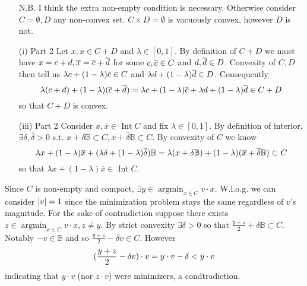\documentclass{article}
\newenvironment{ex}[1]
  {\renewcommand\theexercise{#1}\exercise}
  {\endexercise}
\newcommand{\B}{\mathbb{B}}
\DeclareMathOperator*{\argmin}{arg min}
\DeclareMathOperator*{\inte}{Int}
\newcommand{\idot}[2]{#1 \cdot #2}
\begin{document}
\begin{ex}{4.1}
\begin{itemize}
      N.B. I think the extra non-empty condition is necessary. Otherwise consider $C = \emptyset, D$ any non-convex set. $C \times D = \emptyset$ is vacuously convex, however $D$ is not.
    \item[(i) Part 2]
      \newcommand{\xb}{\overline{x}}
      Let $x, \xb \in C + D$ and $\lambda \in [0, 1]$. By definition of $C + D$ we must have $x = c + d, \xb = \cb + \db$ for some $c, \overline{c} \in C$ and $d, \overline{d} \in D$. Convexity of $C, D$ then tell us $\lambda c + (1-\lambda)\overline{c} \in C$ and $\lambda d + (1-\lambda)\overline{d} \in D$. Consequently
      $$
      \lambda (c + d) + (1-\lambda)(\overline{c} + \overline{d}) = \lambda c + (1-\lambda)\overline{c} + \lambda d + (1-\lambda)\overline{d} \in C + D
      $$
      so that $C+D$ is convex.
    \item[(iii) Part 2]
      Consider $x, \xb \in \inte C$ and fix $\lambda \in [0, 1]$. By definition of interior, $\exists \delta, \overline{\delta} > 0$ s.t. $x + \delta \B \subset C, \xb + \overline{\delta} \B \subset C$. By convexity of $C$ we know
      $$
      \lambda x + (1-\lambda) \xb + (\lambda \delta + (1-\lambda)\overline{\delta}) \B = \lambda (x + \delta \B) + (1-\lambda) \parens{\xb + \overline{\delta} \B} \subset C
      $$
      so that $\lambda x + (1-\lambda) \xb \in \inte C$.
  \end{itemize}
\end{ex} %
\begin{ex}{4.2} %
  Since $C$ is non-empty and compact, $\exists y \in \argmin_{x \in C} \idot{v}{x}$. W.l.o.g. we can consider $\lvert v\rvert = 1$ since the minimization problem stays the same regardless of $v$'s magnitude. For the sake of contradiction suppose there exists $z \in \argmin_{x \in C} \idot{v}{x}, z \ne y$. By strict convexity $\exists \delta > 0$ so that $\frac{y + z}{2} + \delta \B \subset C$. Notably $-v \in \B$ and so $\frac{y + z}{2} - \delta v \in C$. However
  $$
  \parens{\frac{y + z}{2} - \delta v} \cdot v = \idot{y}{v} - \delta < \idot{y}{v}
  $$
  indicating that $\idot{y}{v}$ (nor $\idot{z}{v}$) were minimizers, a condtradiction.
\end{ex} %
\end{document}
